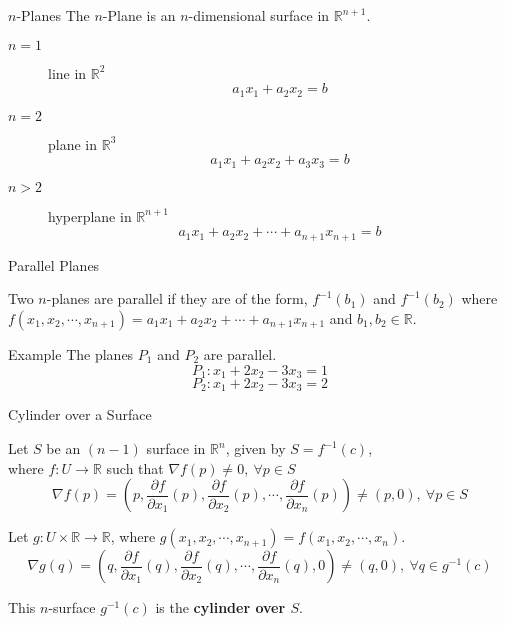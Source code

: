 \documentclass{beamer}
\begin{document}
\begin{frame}{$n$-Planes}
	The $n$-Plane is an $n$-dimensional surface in $\mathbb{R}^{n+1}$.
\begin{description}
	\item[$n=1$] line in $\mathbb{R}^2$
		$$a_1x_1 + a_2x_2 = b$$
	\item[$n=2$] plane in $\mathbb{R}^3$
		$$a_1x_1 + a_2x_2 + a_3x_3 = b$$
	\item[$n>2$] hyperplane in $\mathbb{R}^{n+1}$
		$$a_1x_1 + a_2x_2 + \cdots + a_{n+1}x_{n+1} = b$$
\end{description}
\end{frame}

\begin{frame}{Parallel Planes}
\begin{definition}
	Two $n$-planes are parallel if they are of the form, $f^{-1}(b_1)$ and $f^{-1}(b_2)$ where $f(x_1,x_2,\cdots,x_{n+1}) = a_1x_1 + a_2x_2 + \cdots +a_{n+1}x_{n+1}$ and $b_1,b_2 \in \mathbb{R}$.
\end{definition}
\begin{exampleblock}{Example}
	The planes $P_1$ and $P_2$ are parallel.
	\[ P_1 : x_1 + 2x_2 - 3x_3 = 1 \]
	\[ P_2 : x_1 + 2x_2 - 3x_3 = 2 \]
\end{exampleblock}
\end{frame}

\begin{frame}{Cylinder over a Surface}
\begin{definition}
Let $S$ be an $(n-1)$ surface in $\mathbb{R}^n$, given by $S = f^{-1}(c)$,\\
where $f : U \to \mathbb{R}$ such that $\nabla f(p) \ne 0,\ \forall p \in S$
	$$\nabla f(p) = \left(p,\frac{\partial f}{\partial x_1}(p), \frac{\partial f}{\partial x_2}(p),\cdots, \frac{\partial f}{\partial x_n}(p)\right) \ne (p,0),\ \forall p \in S$$

Let $g : U \times \mathbb{R} \to \mathbb{R}$, where $g(x_1,x_2,\cdots,x_{n+1}) = f(x_1,x_2,\cdots,x_n)$.
	$$\nabla g(q) = \left(q,\frac{\partial f}{\partial x_1}(q), \frac{\partial f}{\partial x_2}(q),\cdots, \frac{\partial f}{\partial x_n}(q),0 \right) \ne (q,0),\ \forall q \in g^{-1}(c)$$

This $n$-surface $g^{-1}(c)$ is the \textbf{cylinder over $S$}.
\end{definition}
\end{frame}
\end{document}
